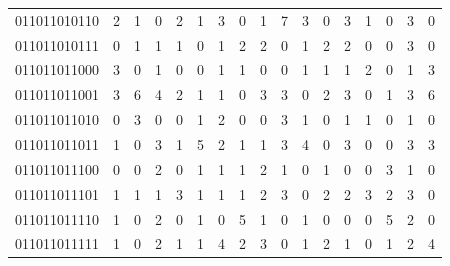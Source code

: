 \documentclass[10pt,a4paper]{article}
\begin{document}
\begin{longtable}{ |c|c|c|c|c|c|c|c|c|c|c|c|c|c|c|c|c| }
    011011010110              & 2                            & 1                                & 0                            & 2                              & 1   & 3   & 0   & 1   & 7   & 3   & 0   & 3   & 1   & 0   & 3   & 0   \\
    011011010111              & 0                            & 1                                & 1                            & 1                              & 0   & 1   & 2   & 2   & 0   & 1   & 2   & 2   & 0   & 0   & 3   & 0   \\
    011011011000              & 3                            & 0                                & 1                            & 0                              & 0   & 1   & 1   & 0   & 0   & 1   & 1   & 1   & 2   & 0   & 1   & 3   \\
    011011011001              & 3                            & 6                                & 4                            & 2                              & 1   & 1   & 0   & 3   & 3   & 0   & 2   & 3   & 0   & 1   & 3   & 6   \\
    011011011010              & 0                            & 3                                & 0                            & 0                              & 1   & 2   & 0   & 0   & 3   & 1   & 0   & 1   & 1   & 0   & 1   & 0   \\
    011011011011              & 1                            & 0                                & 3                            & 1                              & 5   & 2   & 1   & 1   & 3   & 4   & 0   & 3   & 0   & 0   & 3   & 3   \\
    011011011100              & 0                            & 0                                & 2                            & 0                              & 1   & 1   & 1   & 2   & 1   & 0   & 1   & 0   & 0   & 3   & 1   & 0   \\
    011011011101              & 1                            & 1                                & 1                            & 3                              & 1   & 1   & 1   & 2   & 3   & 0   & 2   & 2   & 3   & 2   & 3   & 0   \\
    011011011110              & 1                            & 0                                & 2                            & 0                              & 1   & 0   & 5   & 1   & 0   & 1   & 0   & 0   & 0   & 5   & 2   & 0   \\
    011011011111              & 1                            & 0                                & 2                            & 1                              & 1   & 4   & 2   & 3   & 0   & 1   & 2   & 1   & 0   & 1   & 2   & 4   \\

\end{longtable}
\end{document}
